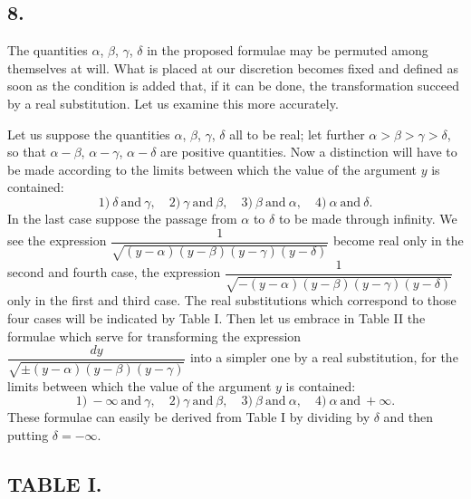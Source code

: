 \documentclass{article}
\begin{document}

\subsection*{8.}

The quantities $\alpha$, $\beta$, $\gamma$, $\delta$ in the proposed formulae may be permuted among themselves at will. What is placed at our discretion becomes fixed and defined as soon as the condition is added that, if it can be done, the transformation succeed by a real substitution. Let us examine this more accurately.

Let us suppose the quantities $\alpha$, $\beta$, $\gamma$, $\delta$ all to be real; let further $\alpha>\beta>\gamma>\delta$, so that $\alpha-\beta$, $\alpha-\gamma$, $\alpha-\delta$ are positive quantities. Now a distinction will have to be made according to the limits between which the value of the argument $y$ is contained:
\[
\text{1)}\ \delta\ \text{and}\ \gamma,\quad\text{2)}\ \gamma\ \text{and}\ \beta,\quad\text{3)}\ \beta\ \text{and}\ \alpha,\quad\text{4)}\ \alpha\ \text{and}\ \delta.
\]
In the last case suppose the passage from $\alpha$ to $\delta$ to be made through infinity. We see the expression $\dfrac{1}{\sqrt{(y-\alpha)(y-\beta)(y-\gamma)(y-\delta)}}$ become real only in the second and fourth case, the expression $\dfrac{1}{\sqrt{-(y-\alpha)(y-\beta)(y-\gamma)(y-\delta)}}$ only in the first and third case. The real substitutions which correspond to those four cases will be indicated by Table I. Then let us embrace in Table II the formulae which serve for transforming the expression $\dfrac{dy}{\sqrt{\pm(y-\alpha)(y-\beta)(y-\gamma)}}$ into a simpler one by a real substitution, for the limits between which the value of the argument $y$ is contained:
\[
\text{1)}\ -\infty\ \text{and}\ \gamma,\quad\text{2)}\ \gamma\ \text{and}\ \beta,\quad\text{3)}\ \beta\ \text{and}\ \alpha,\quad\text{4)}\ \alpha\ \text{and}\ +\infty.
\]
These formulae can easily be derived from Table I by dividing by $\delta$ and then putting $\delta=-\infty$.


\subsection*{TABLE I.}
\end{document}
